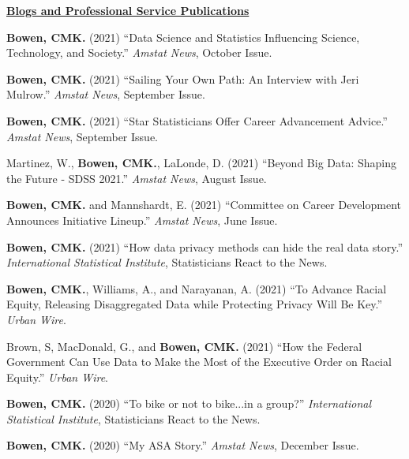 \documentclass[11pt, letterpaper, roman]{moderncv} %
\begin{document}
\vspace{6pt}
\noindent\underline{\textbf{Blogs and Professional Service Publications}}
\vspace{4pt}
\begin{etaremune}[topsep=0pt, itemsep=6pt, partopsep=0pt, parsep=0pt]
    \item \textbf{Bowen, CMK.} (2021) ``Data Science and Statistics Influencing Science, Technology, and Society.'' \textit{Amstat News}, October Issue.
    
    \item \textbf{Bowen, CMK.} (2021) ``Sailing Your Own Path: An Interview with Jeri Mulrow.'' \textit{Amstat News}, September Issue.

    \item \textbf{Bowen, CMK.} (2021) ``Star Statisticians Offer Career Advancement Advice.'' \textit{Amstat News}, September Issue.    
    
    \item Martinez, W., \textbf{Bowen, CMK.}, LaLonde, D. (2021) ``Beyond Big Data: Shaping the Future - SDSS 2021.'' \textit{Amstat News}, August Issue.   
    
    \item \textbf{Bowen, CMK.} and Mannshardt, E. (2021) ``Committee on Career Development Announces Initiative Lineup.'' \textit{Amstat News}, June Issue.

    \item \textbf{Bowen, CMK.} (2021) ``How data privacy methods can hide the real data story.'' \textit{International Statistical Institute}, Statisticians React to the News.
    
    \item \textbf{Bowen, CMK.}, Williams, A., and Narayanan, A. (2021) ``To Advance Racial Equity, Releasing Disaggregated Data while Protecting Privacy Will Be Key.'' \textit{Urban Wire}. 
    
    \item Brown, S, MacDonald, G., and \textbf{Bowen, CMK.} (2021) ``How the Federal Government Can Use Data to Make the Most of the Executive Order on Racial Equity.'' \textit{Urban Wire}. 

    \item \textbf{Bowen, CMK.} (2020) ``To bike or not to bike...in a group?'' \textit{International Statistical Institute}, Statisticians React to the News.

    \item \textbf{Bowen, CMK.} (2020) ``My ASA Story.'' \textit{Amstat News}, December Issue.


\end{etaremune}
\end{document}

